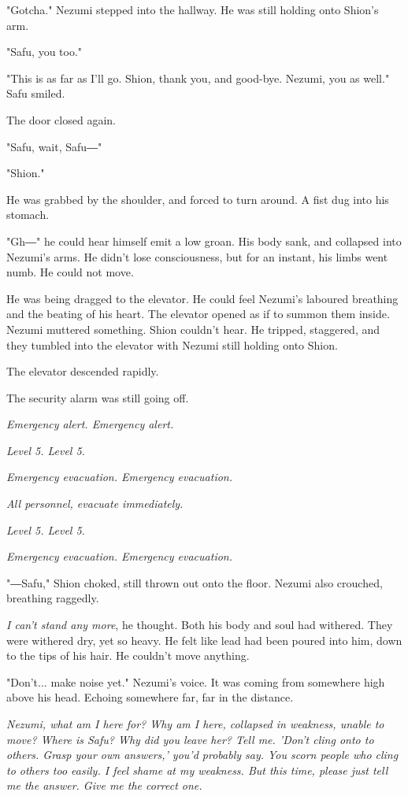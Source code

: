 "Gotcha." Nezumi stepped into the hallway. He was still holding onto
Shion's arm.

"Safu, you too."

"This is as far as I'll go. Shion, thank you, and good-bye. Nezumi, you
as well." Safu smiled.

The door closed again.

"Safu, wait, Safu―"

"Shion."

He was grabbed by the shoulder, and forced to turn around. A fist dug
into his stomach.

"Gh―" he could hear himself emit a low groan. His body sank, and
collapsed into Nezumi's arms. He didn't lose consciousness, but for an
instant, his limbs went numb. He could not move.

He was being dragged to the elevator. He could feel Nezumi's laboured
breathing and the beating of his heart. The elevator opened as if to
summon them inside. Nezumi muttered something. Shion couldn't hear. He
tripped, staggered, and they tumbled into the elevator with Nezumi still
holding onto Shion.

The elevator descended rapidly.~

The security alarm was still going off.

\emph{Emergency alert. Emergency alert.}

\emph{Level 5. Level 5.}

\emph{Emergency evacuation. Emergency evacuation.}

\emph{All personnel, evacuate immediately.}

\emph{Level 5. Level 5.}

\emph{Emergency evacuation. Emergency evacuation.}

"―Safu," Shion choked, still thrown out onto the floor. Nezumi also
crouched, breathing raggedly.

\emph{I can't stand any more}, he thought. Both his body and soul had withered.
They were withered dry, yet so heavy. He felt like lead had been poured
into him, down to the tips of his hair. He couldn't move anything.

"Don't... make noise yet." Nezumi's voice. It was coming from somewhere
high above his head. Echoing somewhere far, far in the distance.

\emph{Nezumi, what am I here for? Why am I here, collapsed in weakness, unable
	to move? Where is Safu? Why did you leave her? Tell me. 'Don't cling
	onto to others. Grasp your own answers,' you'd probably say. You scorn
	people who cling to others too easily. I feel shame at my weakness. But
	this time, please just tell me the answer. Give me the correct one.}

